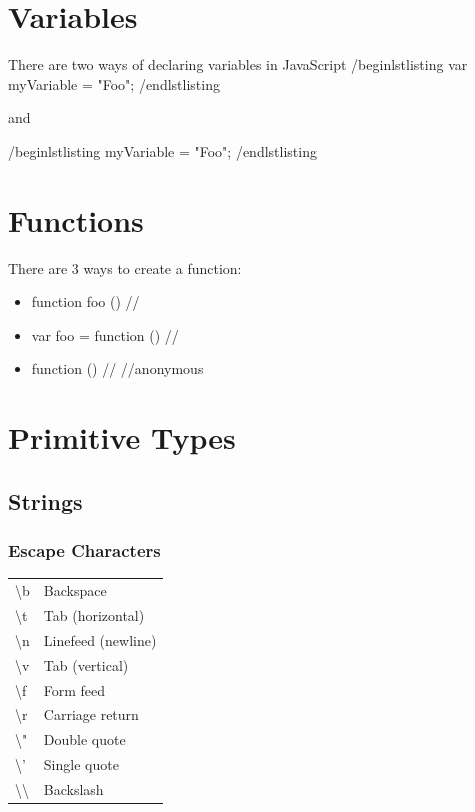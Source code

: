 \documentclass {article}
\begin{document}
\section{Variables}
	There are two ways of declaring variables in JavaScript 
	/begin{lstlisting}
		var myVariable = "Foo";
	/end{lstlisting}

	and 

	/begin{lstlisting}
		myVariable = "Foo";
	/end{lstlisting}




\section{Functions}
	There are 3 ways to create a function: 
	\begin{itemize}
		\item function foo () /{/}
		\item var foo = function () /{/}
		\item function () /{/} //anonymous
	\end{itemize}


\section{Primitive Types}
	\subsection{Strings}
			\subsubsection{Escape Characters}

			\begin{center}
			\begin{tabular} {| l |p{5cm}|}
			
				\textbackslash{b} & Backspace \\
				\textbackslash{t} & Tab (horizontal) \\
				\textbackslash{n} & Linefeed (newline) \\
				\textbackslash{v} & Tab (vertical) \\
				\textbackslash{f} & Form feed  \\
				\textbackslash{r} & Carriage return        \\
				\textbackslash{"} & Double quote           \\
				\textbackslash{'} & Single quote           \\
				\textbackslash{}\textbackslash{} & Backslash              \\

			\end{tabular}
			\end{center}
\end{document}
